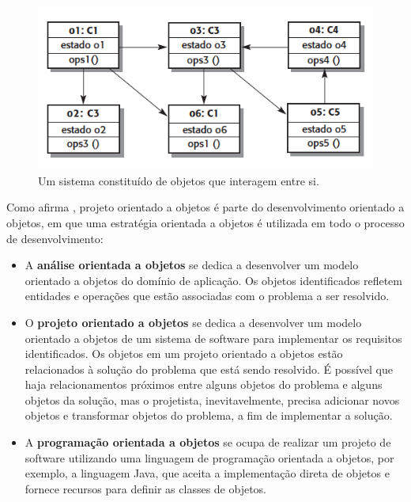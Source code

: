\begin{figure}[H]
  \centering
  \includegraphics[scale=0.6]{imagens/figura-01.png}
  \caption{Um sistema constituído de objetos que interagem entre si.}
  \label{fig:figura-01}
\end{figure}

Como afirma , projeto orientado a objetos é parte do desenvolvimento orientado a objetos, em que uma
estratégia orientada a objetos é utilizada em todo o processo de desenvolvimento:

\begin{itemize}
  \item A \textbf{análise orientada a objetos} se dedica a desenvolver um modelo orientado a objetos do
  domínio de aplicação. Os objetos identificados refletem entidades e operações que estão
  associadas com o problema a ser resolvido.

  \item O \textbf{projeto orientado a objetos} se dedica a desenvolver um modelo orientado a objetos de
  um sistema de software para implementar os requisitos identificados. Os objetos em um
  projeto orientado a objetos estão relacionados à solução do problema que está sendo resolvido.
  É possível que haja relacionamentos próximos entre alguns objetos do problema e
  alguns objetos da solução, mas o projetista, inevitavelmente, precisa adicionar novos objetos
  e transformar objetos do problema, a fim de implementar a solução.

  \item A \textbf{programação orientada a objetos} se ocupa de realizar um projeto de software utilizando
  uma linguagem de programação orientada a objetos, por exemplo, a linguagem Java, que
  aceita a implementação direta de objetos e fornece recursos para definir as classes de
  objetos.
\end{itemize}

